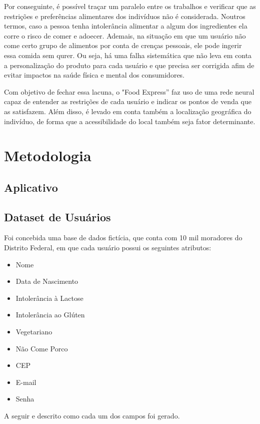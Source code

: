 \documentclass[conference,compsoc]{IEEEtran}
\begin{document}
Por conseguinte, é possível traçar um paralelo entre os trabalhos e verificar que as restrições e preferências alimentares dos indivíduos não é considerada. Noutros termos, caso a pessoa tenha intolerância alimentar a algum dos ingredientes ela corre o risco de comer e adoecer. Ademais, na situação em que um usuário não come certo grupo de alimentos por conta de crenças pessoais, ele pode ingerir essa comida sem qurer. Ou seja, há uma falha sistemática que não leva em conta a personalização do produto para cada usuário e que precisa ser corrigida afim de evitar impactos na saúde física e mental dos consumidores.

Com objetivo de fechar essa lacuna, o "Food Express” faz uso de uma rede neural capaz de entender as restrições de cada usuário e indicar os pontos de venda que as satisfazem. Além disso, é levado em conta também a localização geográfica do indivíduo, de forma que a acessibilidade do local também seja fator determinante.

\section{ Metodologia }

\subsection{Aplicativo}

\subsection{Dataset de Usuários}
Foi concebida uma base de dados fictícia, que conta com 10 mil moradores do Distrito Federal, em que cada usuário possui os seguintes atributos:

\begin{itemize}
  \item Nome
  \item Data de Nascimento
  \item Intolerância à Lactose
  \item Intolerância ao Glúten
  \item Vegetariano
  \item Não Come Porco
  \item CEP
  \item E-mail
  \item Senha
\end{itemize}

A seguir e descrito como cada um dos campos foi gerado.
\end{document}
